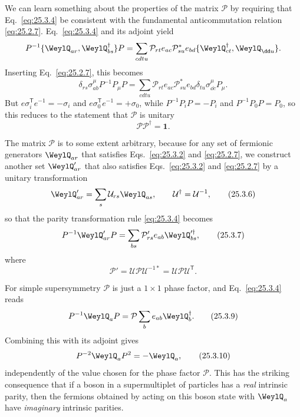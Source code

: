 We can learn something about the properties of the matrix \(\mathcal P\) by
requiring that\linebreak
Eq.~\eqref{eq:25.3.4} be consistent with the fundamental
anticommutation relation \eqref{eq:25.2.7}.\linebreak
Eq.~\eqref{eq:25.3.4} and its adjoint yield
\[
P^{-1}\{\WeylQ_{ar},\WeylQ_{bs}^{\dagger}\}P
=\sum_{cdtu}\mathcal P_{rt}e_{ac}\mathcal P_{su}^{*}e_{bd}
\{\WeylQ_{ct}^{\dagger},\WeylQ_{\dd u}\}.
\]
Inserting Eq.~\eqref{eq:25.2.7}, this becomes
\[
\delta_{rs}\sigma^\mu_{ab}P^{-1}P_\mu P
=\sum_{cdtu}\mathcal P_{rt}e_{ac}\mathcal P_{su}^{*}e_{bd}
\delta_{tu}\sigma^\mu_{\dd c}P_\mu.
\]
But \(e\sigma_i^{\mathsf T}e^{-1}=-\sigma_i\) and
\(e\sigma_0^{\mathsf T}e^{-1}=+\sigma_0\), while \(P^{-1}P_iP=-P_i\) and
\(P^{-1}P_0P=P_0\), so this reduces to the statement that \(\mathcal P\) is
unitary
\begin{equation}
\mathcal P\mathcal P^\dagger=\mathbf{1}.
\tag{25.3.5}\label{eq:25.3.5}
\end{equation}

The matrix \(\mathcal P\) is to some extent arbitrary, because for any set of
fermionic generators \(\WeylQ_{ar}\) that satisfies Eqs.~\eqref{eq:25.3.2}
and \eqref{eq:25.2.7}, we construct another set \(\WeylQ'_{ar}\) that also
satisfies Eqs.~\eqref{eq:25.3.2} and \eqref{eq:25.2.7} by a unitary
transformation
\begin{equation}
\WeylQ'_{ar}=\sum_s\mathcal U_{rs}\WeylQ_{as},
\qquad
\mathcal U^\dagger=\mathcal U^{-1},
\tag{25.3.6}\label{eq:25.3.6}
\end{equation}
so that the parity transformation rule \eqref{eq:25.3.4} becomes
\begin{equation}
P^{-1}\WeylQ'_{ar}P
=\sum_{bs}\mathcal P'_{rs}e_{ab}\WeylQ_{bs}^{\prime\dagger},
\tag{25.3.7}\label{eq:25.3.7}
\end{equation}
where
\begin{equation}
\mathcal P'=\mathcal U\mathcal P\mathcal U^{-1*}
=\mathcal U\mathcal P\mathcal U^{\mathsf T}.
\tag{25.3.8}\label{eq:25.3.8}
\end{equation}

For simple supersymmetry \(\mathcal P\) is just a \(1\times1\) phase factor,
and Eq.~\eqref{eq:25.3.4} reads
\begin{equation}
P^{-1}\WeylQ_aP
=\mathcal P\sum_b e_{ab}\WeylQ_b^\dagger.
\tag{25.3.9}\label{eq:25.3.9}
\end{equation}
Combining this with its adjoint gives
\begin{equation}
P^{-2}\WeylQ_aP^2=-\WeylQ_a,
\tag{25.3.10}\label{eq:25.3.10}
\end{equation}
independently of the value chosen for the phase factor \(\mathcal P\). This
has the striking consequence that if a boson in a supermultiplet of
particles has a \emph{real} intrinsic parity, then the fermions obtained by
acting on this boson state with \(\WeylQ_a\) have \emph{imaginary} intrinsic
parities.

